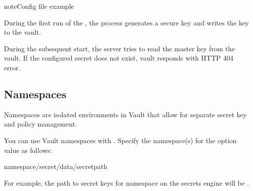\documentclass[letterpaper,10pt,english]{sphinxmanual}
\begin{document}
\begin{sphinxadmonition}{note}{Config file example}

\begin{sphinxVerbatim}[commandchars=\\\{\}]
\end{sphinxVerbatim}
\end{sphinxadmonition}

\sphinxAtStartPar
During the first run of the , the process generates a secure key and writes the key to the vault.

\sphinxAtStartPar
During the subsequent start, the server tries to read the master key from the vault. If the configured secret does not exist, vault responds with HTTP 404 error.


\subsection{Namespaces}
\label{\detokenize{vault:namespaces}}\label{\detokenize{vault:vault-namespaces}}
\sphinxAtStartPar
Namespaces are isolated environments in Vault that allow for separate secret key and policy management.

\sphinxAtStartPar
You can use Vault namespaces with . Specify the namespace(s) for the  option value as follows:

\begin{sphinxVerbatim}[commandchars=\\\{\}]
\PYGZlt{}namespace\PYGZgt{}/secret/data/\PYGZlt{}secret\PYGZus{}path\PYGZgt{}
\end{sphinxVerbatim}

\sphinxAtStartPar
For example, the path to secret keys for namespace  on  the secrets engine  will be .
\end{document}
